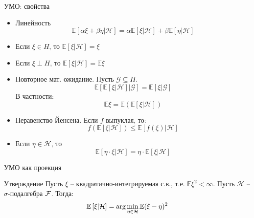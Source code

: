 \documentclass{beamer}
\begin{document}
\begin{frame}{УМО: свойства}
    \begin{itemize}
        \item Линейность
        $$
            \mathbb{E}\left[ \alpha \xi + \beta \eta | \mathcal{H} \right]
            = \alpha \mathbb{E}\left[ \xi  | \mathcal{H} \right] + \beta \mathbb{E} \left[ \eta  | \mathcal{H} \right]
        $$

        \item Если $\xi \in H$, то $\mathbb{E}\left[ \xi | \mathcal{H} \right] = \xi$

        \item Если $\xi \perp H$, то $\mathbb{E}\left[ \xi | \mathcal{H} \right] = \mathbb{E} \xi$
        
        \item Повторное мат. ожидание. Пусть $\mathcal{G} \subseteq H$. 
        $$
            \mathbb{E} \left[ \mathbb{E}\left[ \xi | \mathcal{H} \right] | \mathcal{G} \right] = \mathbb{E}\left[ \xi | \mathcal{G} \right]
        $$
        В частности:
        $$
            \mathbb{E} \xi = \mathbb{E} (\mathbb{E}\left[ \xi | \mathcal{H} \right]) 
        $$

        \item Неравенство Йенсена. Если $f$ выпуклая, то:
        $$
            f(\mathbb{E}\left[ \xi | \mathcal{H} \right]) \leq \mathbb{E}\left[ f(\xi) | \mathcal{H} \right]
        $$

        \item Если $\eta \in \mathcal{H}$, то
        $$
            \mathbb{E} \left[ \eta\cdot\xi | \mathcal{H} \right] = \eta \cdot \mathbb{E}\left[ \xi | \mathcal{H} \right] 
        $$
    \end{itemize}
\end{frame}

\begin{frame}{УМО как проекция}
    \begin{block}{Утверждение}
        Пусть $\xi$ -- квадратично-интегрируемая с.в., т.е. $\mathbb{E} \xi^2 < \infty$. Пусть $\mathcal{H}$ -- $\sigma$-подалгебра $\mathcal{F}$. Тогда:
        $$
            \mathbb{E}\left[ \xi | \mathcal{H} \right] = \arg \min_{\eta \in \mathcal{H}} \mathbb{E} (\xi-\eta)^2
        $$
    \end{block}
\end{frame}
\end{document}
